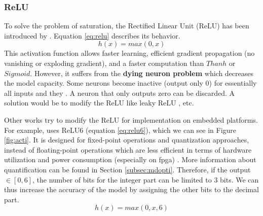 \subsubsection{ReLU}
To solve the problem of saturation, the Rectified Linear Unit (ReLU) has been introduced by \textcite{krizhevsky_imagenet_2012}. Equation \eqref{eq:relu} describes its behavior.
\begin{equation}
    h(x) = max(0, x)
    \label{eq:relu}
\end{equation}
%
This activation function allows faster learning, efficient gradient propagation (no vanishing or exploding gradient), and a faster computation than $Thanh$ or $Sigmoid$. However, it suffers from the \textbf{dying neuron problem} which decreases the model capacity. Some neurons become inactive (output only 0) for essentially all inputs and they . A neuron that only outputs zero can be discarded. A solution would be to modify the ReLU like leaky ReLU \cite{maas_rectier_2014}, etc.

Other works try to modify the ReLU for implementation on embedded platforms. For example, \cite{howard_mobilenets_2017} uses ReLU6 (equation \eqref{eq:relu6}), which we can see in Figure \ref{fig:acti}. It is designed for fixed-point operations and quantization approaches, instead of floating-point operations which are less efficient in terms of hardware utilization and power consumption (especially on \acrshort{fpga}) \cite{david_hardware_2007}. More information about quantification can be found in Section \ref{subsec:mdopti}. Therefore, if the output $\in [ 0, 6 ]$, the number of bits for the integer part can be limited to 3 bits. We can thus increase the accuracy of the model by assigning the other bits to the decimal part.
%
\begin{equation}
    h(x) = max(0, x, 6)
    \label{eq:relu6}
\end{equation}
